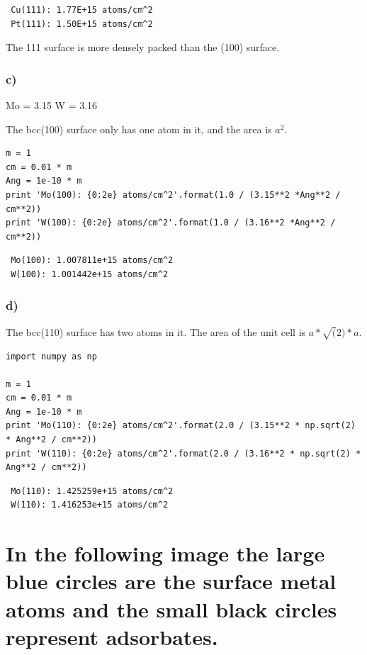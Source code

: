 \documentclass{article}
\begin{document}
\begin{verbatim}
 Cu(111): 1.77E+15 atoms/cm^2
 Pt(111): 1.50E+15 atoms/cm^2
\end{verbatim}

The 111 surface is more densely packed than the (100) surface.
\subsubsection{c)}
\label{sec-1-1-3}


Mo = 3.15
W = 3.16

The bcc(100) surface only has one atom in it, and the area is $a^2$.


\begin{verbatim}
m = 1
cm = 0.01 * m
Ang = 1e-10 * m 
print 'Mo(100): {0:2e} atoms/cm^2'.format(1.0 / (3.15**2 *Ang**2 / cm**2))
print 'W(100): {0:2e} atoms/cm^2'.format(1.0 / (3.16**2 *Ang**2 / cm**2))
\end{verbatim}

\begin{verbatim}
 Mo(100): 1.007811e+15 atoms/cm^2
 W(100): 1.001442e+15 atoms/cm^2
\end{verbatim}
\subsubsection{d)}
\label{sec-1-1-4}


The bcc(110) surface has two atoms in it. The area of the unit cell is $a * \sqrt(2) * a$.


\begin{verbatim}
import numpy as np

m = 1
cm = 0.01 * m
Ang = 1e-10 * m 
print 'Mo(110): {0:2e} atoms/cm^2'.format(2.0 / (3.15**2 * np.sqrt(2) * Ang**2 / cm**2))
print 'W(110): {0:2e} atoms/cm^2'.format(2.0 / (3.16**2 * np.sqrt(2) * Ang**2 / cm**2))
\end{verbatim}

\begin{verbatim}
 Mo(110): 1.425259e+15 atoms/cm^2
 W(110): 1.416253e+15 atoms/cm^2
\end{verbatim}
\section{In the following image the large blue circles are the surface metal atoms and the small black circles represent adsorbates.}
\label{sec-2}
\end{document}
